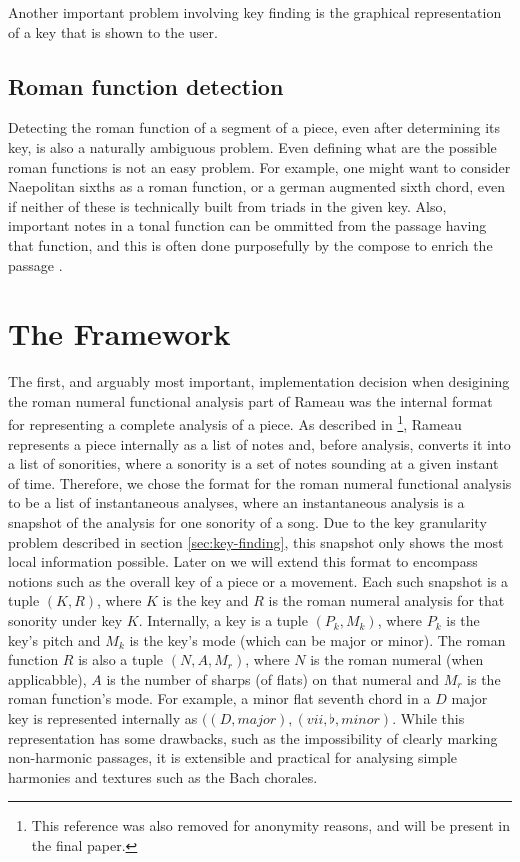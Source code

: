 Another important problem involving key finding is the graphical
representation of a key that is shown to the user.

\subsection{Roman function detection}
\label{sec:roman-funct-detect}

Detecting the roman function of a segment of a piece, even after
determining its key, is also a naturally ambiguous problem. Even
defining what are the possible roman functions is not an easy problem.
For example, one might want to consider Naepolitan sixths as a roman
function, or a german augmented sixth chord, even if neither of these
is technically built from triads in the given key. Also, important
notes in a tonal function can be ommitted from the passage having that
function, and this is often done purposefully by the compose to enrich
the passage \cite{schoenberg83:theory}.


\section{The Framework}
\label{sec:framework}

The first, and arguably most important, implementation decision when
desigining the roman numeral functional analysis part of Rameau was
the internal format for representing a complete analysis of a piece.
As described in \footnote{This reference was also removed for
  anonymity reasons, and will be present in the final paper.}, Rameau
represents a piece internally as a list of notes and, before analysis,
converts it into a list of sonorities, where a sonority is a set of
notes sounding at a given instant of time. Therefore, we chose the
format for the roman numeral functional analysis to be a list of
instantaneous analyses, where an instantaneous analysis is a snapshot
of the analysis for one sonority of a song. Due to the key granularity
problem described in section \ref{sec:key-finding}, this snapshot only
shows the most local information possible. Later on we will extend
this format to encompass notions such as the overall key of a piece or
a movement. Each such snapshot is a tuple $(K,R)$, where $K$ is the
key and $R$ is the roman numeral analysis for that sonority under key
$K$. Internally, a key is a tuple $(P_k,M_k)$, where $P_k$ is the
key's pitch and $M_k$ is the key's mode (which can be major or minor).
The roman function $R$ is also a tuple $(N,A,M_r)$, where $N$ is the
roman numeral (when applicabble), $A$ is the number of sharps (of
flats) on that numeral and $M_r$ is the roman function's mode. For
example, a minor flat seventh chord in a $D$ major key is represented
internally as $((D,major),(vii,\flat,minor)$. While this
representation has some drawbacks, such as the impossibility of
clearly marking non-harmonic passages, it is extensible and practical
for analysing simple harmonies and textures such as the Bach
chorales.

